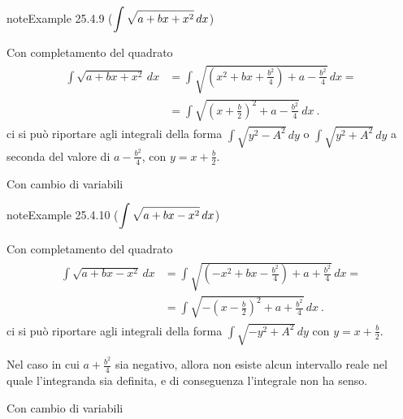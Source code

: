 \documentclass[letterpaper,10pt,italian]{jupyterBook}
\begin{document}
\label{ch/infinitesimal_calculus/integrals:example-14}
\begin{sphinxadmonition}{note}{Example 25.4.9 (\protect\(\displaystyle \int \sqrt{a + bx + x^2} \, dx \protect\))}



\sphinxAtStartPar
{} Con completamento del quadrato
\begin{equation*}
\begin{split}\begin{aligned}
  \int \sqrt{a + bx + x^2} \, dx 
  & = \int \sqrt{ \left( x^2 + b x + \frac{b^2}{4} \right) + a - \frac{b^2}{4}} \, dx = \\
  & = \int \sqrt{ \left( x + \frac{b}{2} \right)^2 + a - \frac{b^2}{4}} \, dx \ .
\end{aligned}\end{split}
\end{equation*}
\sphinxAtStartPar
ci si può riportare agli integrali della forma \(\displaystyle \int \sqrt{y^2 - A^2} \, dy\) o \(\displaystyle \int \sqrt{y^2 + A^2} \, dy\) a seconda del valore di \(a - \frac{b^2}{4}\), con \(y = x+ \frac{b}{2}\).

\sphinxAtStartPar
{} Con cambio di variabili
\end{sphinxadmonition}
\label{ch/infinitesimal_calculus/integrals:example-15}
\begin{sphinxadmonition}{note}{Example 25.4.10 (\protect\(\displaystyle \int \sqrt{a + bx - x^2} \, dx \protect\))}



\sphinxAtStartPar
{} Con completamento del quadrato
\begin{equation*}
\begin{split}\begin{aligned}
  \int \sqrt{a + bx - x^2} \, dx 
  & = \int \sqrt{ \left( - x^2 + b x - \frac{b^2}{4} \right) + a + \frac{b^2}{4}} \, dx = \\
  & = \int \sqrt{-\left( x - \frac{b}{2} \right)^2 + a + \frac{b^2}{4}} \, dx \ .
\end{aligned}\end{split}
\end{equation*}
\sphinxAtStartPar
ci si può riportare agli integrali della forma \(\displaystyle \int \sqrt{-y^2 + A^2} \, dy\) con \(y = x+ \frac{b}{2}\).

\sphinxAtStartPar
{} Nel caso in cui \(a + \frac{b^2}{4}\) sia negativo, allora non esiste alcun intervallo reale nel quale l’integranda sia definita, e di conseguenza l’integrale non ha senso.

\sphinxAtStartPar
{} Con cambio di variabili
\end{sphinxadmonition}
\end{document}
